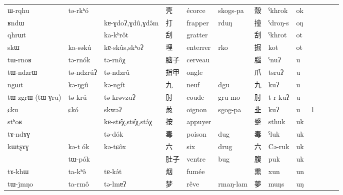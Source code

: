 \documentclass[oldfontcommands,oneside,a4paper,11pt]{article}
\newcommand{\ipa}[1]{{\phon #1}} %
\newcommand{\zh}[1]{{\cn #1}}
\begin{document}
\begin{landscape}
\begin{table}[h]
{\begin{tabular}{lllllllllllll}
\ipa{ɯ-rqhu}  &	\ipa{tə-rkʰó}  &	\ipa{}  &		\zh{壳}  &	écorce  &	\ipa{skogs-pa}  &	\zh{殼}  &	\ipa{*ˁkhrok}  &	\ipa{ok}  &	  \\
\ipa{ʁndɯ}  &	\ipa{}  &	\ipa{kɐ-ɣdoʔ,ɣdû,ɣdə̂m}  &		\zh{打}  &	frapper  &	\ipa{rduŋ}  &	\zh{撞}  &	\ipa{*ˁdroŋ-s}  &	\ipa{oŋ}  &	  \\
\ipa{qhrɯt}  &	\ipa{}  &	\ipa{ka-kʰrôt}  &		\zh{刮}  &	gratter  &	\ipa{}  &	\zh{刮}  &	\ipa{*ˁkhrot}  &	\ipa{ot}  &	  \\
\ipa{skɯ}  &	\ipa{ka-səkú}  &	\ipa{kɐ-skûs,skʰoʔ}  &		\zh{埋}  &	enterrer  &	\ipa{rko}  &	\zh{掘}  &	\ipa{*kot}  &	\ipa{ot}  &	  \\
\ipa{tɯ-rnoʁ}  &	\ipa{tə-rnók}  &	\ipa{tə-rnôχ}  &		\zh{脑子}  &	cerveau  &	\ipa{}  &	\zh{腦}  &	\ipa{*ˁnuʔ}  &	\ipa{u}  &	  \\
\ipa{tɯ-ndzrɯ}  &	\ipa{tə-ndzrúʔ}  &	\ipa{tə-ndzrû}  &		\zh{指甲}  &	ongle  &	\ipa{}  &	\zh{爪}  &	\ipa{*tsruʔ}  &	\ipa{u}  &	  \\
\ipa{ngɯt}  &	\ipa{kə-ŋgû}  &	\ipa{kə-ngít}  &		\zh{九}  &	neuf  &	\ipa{dgu}  &	\zh{九}  &	\ipa{*kuʔ}  &	\ipa{u}  &	  \\
\ipa{tɯ-zgrɯ (tɯ-ɣru)}  &	\ipa{tə-krú}  &	\ipa{tə-krəvzuʔ}  &		\zh{肘}  &	coude  &	\ipa{gru-mo}  &	\zh{肘}  &	\ipa{*t-r-kuʔ}  &	\ipa{u}  &	  \\
\ipa{ɕku}  &	\ipa{ɕkó}  &	\ipa{skwəʔ}  &		\zh{葱}  &	oignon  &	\ipa{sgog-pa}  &	\zh{韭}  &	\ipa{*kuʔ}  &	\ipa{u}  &	1  \\
\ipa{stʰoʁ}  &	\ipa{}  &	\ipa{kɐ-stɐ̂χ,stɐ̂χ,stə́χ}  &		\zh{按}  &	appuyer  &	\ipa{}  &	\zh{蹙}  &	\ipa{*sthuk}  &	\ipa{uk}  &	  \\
\ipa{tɤ-ndɤɣ}  &	\ipa{}  &	\ipa{tə-dók}  &		\zh{毒}  &	poison  &	\ipa{dug}  &	\zh{毒}  &	\ipa{*ˁluk}  &	\ipa{uk}  &	  \\
\ipa{kɯtʂɤɣ}  &	\ipa{kə-t􀄅ók}  &	\ipa{kə-tɕôx}  &		\zh{六}  &	six  &	\ipa{drug}  &	\zh{六}  &	\ipa{*Cə-ruk}  &	\ipa{uk}  &	  \\
\ipa{}  &	\ipa{tɯ-pók}  &	\ipa{}  &		\zh{肚子}  &	ventre  &	\ipa{bug}  &	\zh{腹}  &	\ipa{*puk}  &	\ipa{uk}  &	  \\
\ipa{tɤ-khɯ}  &	\ipa{ta-kʰə̂}  &	\ipa{tɐ-kə́t}  &		\zh{烟}  &	fumée  &	\ipa{}  &	\zh{熏}  &	\ipa{*xun}  &	\ipa{un}  &	  \\
\ipa{tɯ-jmŋo}  &	\ipa{ta-rmô}  &	\ipa{tə-lmɐʔ}  &		\zh{梦}  &	rêve  &	\ipa{rmaŋ-lam}  &	\zh{夢}  &	\ipa{*muŋs}  &	\ipa{uŋ}  &	  \\
\end{tabular}}
\end{table}

   \end{landscape}



\end{document}
